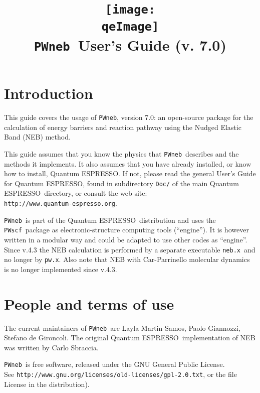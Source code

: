 \documentclass[12pt,a4paper]{article}
\def\version{7.0}
\def\qe{{\sc Quantum ESPRESSO}}
\def\NEB{\texttt{PWneb}} %
\def\pwx{\texttt{pw.x}}
\def\nebx{\texttt{neb.x}}
\def\PWscf{\texttt{PWscf}}
\begin{document}
 
\author{}
\date{}

\def\qeImage{../../Doc/quantum_espresso}

\title{
  \texttt{[image: \\qeImage]} \\
  \Huge \NEB\ User's Guide (v. \version)
}

\maketitle

\tableofcontents

\section{Introduction}

This guide covers the usage of \NEB, version \version: 
an open-source package for the calculation of energy barriers 
and reaction pathway using the Nudged Elastic Band (NEB) method.

This guide assumes that you know the physics 
that \NEB\ describes and the methods it implements.
It also assumes  that you have already installed,
or know how to install, \qe. If not, please read
the general User's Guide for \qe, found in 
subdirectory \texttt{Doc/} of the main \qe\ directory,
or consult the web site:\\
\texttt{http://www.quantum-espresso.org}.

\NEB \ is part of the \qe \ distribution and uses the \PWscf\
package as electronic-structure computing tools (``engine''). 
It is however written in a modular way and could be adapted 
to use other codes as ``engine''. Since v.4.3 the NEB calculation
is performed by a separate executable \nebx\ and no longer by 
\pwx. Also note that NEB with Car-Parrinello molecular dynamics 
is no longer implemented since v.4.3.

\section{People and terms of use}
The current maintainers of \NEB\ are Layla Martin-Samos,
Paolo Giannozzi, Stefano de Gironcoli.
The original \qe \ implementation of NEB was written 
by Carlo Sbraccia.

\NEB\ is free software, released under the 
GNU General Public License. \\ See
\texttt{http://www.gnu.org/licenses/old-licenses/gpl-2.0.txt}, 
or the file License in the distribution).
    
\end{document}
